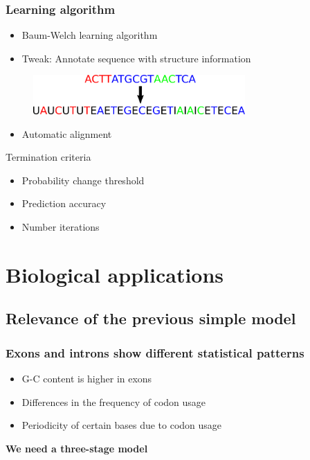 \documentclass{beamer}[12pt]
\begin{document}
\begin{frame}
\frametitle{Learning algorithm}
	\begin{itemize}
		\item Baum-Welch learning algorithm
		\item Tweak: Annotate sequence with structure information
	\end{itemize}
	\begin{figure}
		\includegraphics[height=1.5cm]{../picturesforthepresentation/annotation.png}
	\end{figure}
	\begin{itemize}
		\item Automatic alignment
	\end{itemize}
	\begin{block}{Termination criteria}
		\begin{itemize}
			\item Probability change threshold
			\item Prediction accuracy
			\item Number iterations
		\end{itemize}
	\end{block}
\end{frame}

\section{Biological applications}
\subsection{Relevance of the previous simple model}

\begin{frame}
\frametitle{Exons and introns show different statistical patterns}
\begin{itemize}
	\item G-C content is higher in exons
	\item Differences in the frequency of codon usage
	\item Periodicity of certain bases due to codon usage
\end{itemize}
		
	\vspace{0.5cm}
	
	\pause\begin{center}
		\textbf{We need a three-stage model }
	\end{center}
\end{frame}
\end{document}
